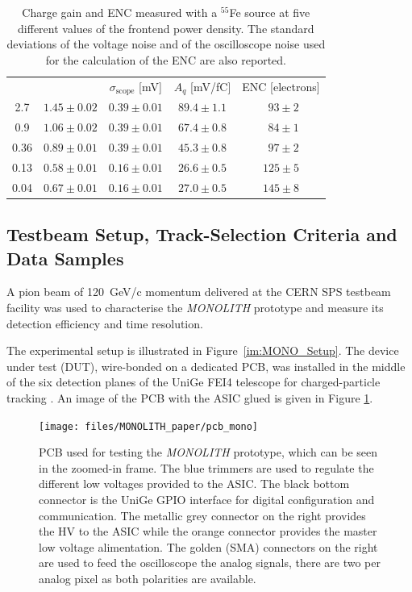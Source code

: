 		\begin{table}[h]
			\centering
			\renewcommand{\arraystretch}{1.3}
			\begin{tabular}{|c|c|c|c|c|}
			\cline{1-5}
			\cline{1-5}
			\ \power [W/cm$^2$] &  \noise [mV] & $\sigma_{\text{scope}}$ [mV] & $A_q$ [mV/fC] & ENC [electrons] \\
			\cline{1-5}
			2.7   & $ 1.45 \pm 0.02 $ & $ 0.39\pm0.01 $ & $89.4 \pm 1.1 $ & $~~93\pm2$ \\
			0.9   & $ 1.06 \pm 0.02 $ & $ 0.39\pm0.01 $ & $67.4 \pm 0.8 $ & $~~84\pm1$ \\
			0.36  & $ 0.89 \pm 0.01 $ & $ 0.39\pm0.01 $ & $45.3 \pm 0.8 $ & $~~97\pm2$ \\
			0.13  & $ 0.58 \pm 0.01 $ & $ 0.16\pm0.01 $ & $26.6 \pm 0.5 $ & $ 125\pm5$ \\
			0.04  & $ 0.67 \pm 0.01 $ & $ 0.16\pm0.01 $ & $27.0 \pm 0.5 $ & $ 145\pm8$ \\
			\cline{1-5}
			\end{tabular}
			\caption{Charge gain and ENC measured with a $^{55}$Fe source at five different values of the frontend power density. The standard deviations  of the voltage noise and of the oscilloscope noise used for the calculation of the ENC are also reported.}
			\label{tab:MONO_gain} 
		\end{table}

	
		\subsection{Testbeam Setup, Track-Selection Criteria and Data Samples}

		A pion beam of \SI{120}{\giga\electronvolt}/c momentum delivered at the CERN SPS testbeam facility was used to characterise the \textit{MONOLITH} prototype and measure its detection efficiency and time resolution. 

		The experimental setup is illustrated in Figure~\ref{im:MONO_Setup}. The device under test (DUT), wire-bonded on a dedicated PCB, was installed in the middle of the six detection planes of the UniGe FEI4 telescope for charged-particle tracking \cite{telescope}. An image of the PCB with the ASIC glued is given in Figure \ref{im:MONO_pcb}.
		\begin{figure}[h]
			\centering
			\texttt{[image: files/MONOLITH\_paper/pcb\_mono]}
			\caption{PCB used for testing the \textit{MONOLITH} prototype, which can be seen in the zoomed-in frame. The blue trimmers are used to regulate the different low voltages provided to the ASIC. The black bottom connector is the UniGe GPIO interface for digital configuration and communication. The metallic grey connector on the right provides the HV to the ASIC while the orange connector provides the master low voltage alimentation. The golden (SMA) connectors on the right are used to feed the oscilloscope the analog signals, there are two per analog pixel as both polarities are available. }
			\label{im:MONO_pcb} 
		\end{figure}
		
